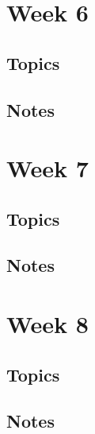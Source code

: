 \documentclass[12pt]{article}
\begin{document}

\section{Week 6}

\subsection{Topics}

\subsection{Notes}





\section{Week 7}

\subsection{Topics}

\subsection{Notes}




\section{Week 8}

\subsection{Topics}

\subsection{Notes}




\end{document}
